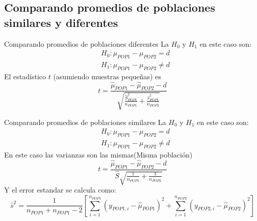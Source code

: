 \subsection{Comparando promedios de poblaciones similares y diferentes}
\begin{frame}{Comparando promedios de poblaciones diferentes}
	La $H_0$ y $H_1$ en este caso son:
		\begin{align*}
			& H_0 : \mu_{POP1} - \mu_{POP2} = d \\
			& H_1 : \mu_{POP1} - \mu_{POP2} \neq d
		\end{align*}
	El estadístico $t$ (asumiendo muestras pequeñas) es
		$$t=\frac{\hat{\mu}_{POP1} - \hat{\mu}_{POP2} - d}{\sqrt{\frac{\hat{S}_{POP1}^{2}}{n_{POP1}}+\frac{\hat{s}_{POP1}^{2}}{n_{POP2}}}}$$
\end{frame}
\begin{frame}{Comparando promedios de poblaciones similares}
	La $H_0$ y $H_1$ en este caso son:
		\begin{align*}
			& H_0 : \mu_{POP1} - \mu_{POP2} = d \\
			& H_1 : \mu_{POP1} - \mu_{POP2} \neq d
		\end{align*}
	En este caso las varianzas son las mismas(Misma población)
	$$t=\frac{\hat{\mu}_{POP1} - \hat{\mu}_{POP2} - d}{\hat{S}\sqrt{\frac{1}{n_{POP1}}+\frac{1}{n_{POP2}}}}$$
	Y el error estandar se calcula como:
	$$\hat{s}^{2}=\frac{1}{n_{POP1} + n_{POP1} -2}\left[ \sum \limits_{i=1}^{n_{POP1}} (y_{POP1, i}-\hat{\mu}_{POP1})^2+
	\sum \limits_{i=1}^{n_{POP2}}(y_{POP2, i}-\hat{\mu}_{POP2})^2 \right]$$
\end{frame}